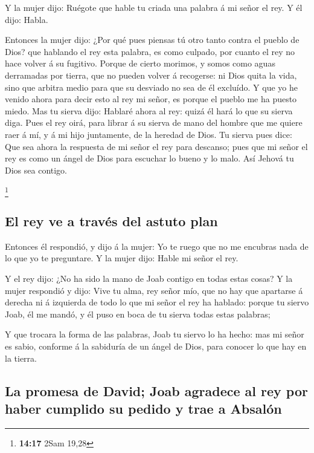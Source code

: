  Y la mujer dijo: Ruégote que hable tu criada una palabra á
mi señor el rey. Y él dijo: Habla.

 Entonces la mujer dijo: ¿Por qué pues piensas tú otro
tanto contra el pueblo de Dios? que hablando el rey esta palabra, es
como culpado, por cuanto el rey no hace volver á su fugitivo.
 Porque de cierto morimos, y somos como aguas derramadas
por tierra, que no pueden volver á recogerse: ni Dios quita la vida,
sino que arbitra medio para que su desviado no sea de él excluído.
 Y que yo he venido ahora para decir esto al rey mi señor,
es porque el pueblo me ha puesto miedo. Mas tu sierva dijo: Hablaré
ahora al rey: quizá él hará lo que su sierva diga.  Pues el
rey oirá, para librar á su sierva de mano del hombre que me quiere raer
á mí, y á mi hijo juntamente, de la heredad de Dios.  Tu
sierva pues dice: Que sea ahora la respuesta de mi señor el rey para
descanso; pues que mi señor el rey es como un ángel de Dios para
escuchar lo bueno y lo malo. Así Jehová tu Dios sea contigo.

\footnote{\textbf{14:17} 2Sam 19,28}

\hypertarget{el-rey-ve-a-travuxe9s-del-astuto-plan}{%
\subsection{El rey ve a través del astuto
plan}\label{el-rey-ve-a-travuxe9s-del-astuto-plan}}

 Entonces él respondió, y dijo á la mujer: Yo te ruego que
no me encubras nada de lo que yo te preguntare. Y la mujer dijo: Hable
mi señor el rey.

 Y el rey dijo: ¿No ha sido la mano de Joab contigo en
todas estas cosas? Y la mujer respondió y dijo: Vive tu alma, rey señor
mío, que no hay que apartarse á derecha ni á izquierda de todo lo que mi
señor el rey ha hablado: porque tu siervo Joab, él me mandó, y él puso
en boca de tu sierva todas estas palabras;

 Y que trocara la forma de las palabras, Joab tu siervo lo
ha hecho: mas mi señor es sabio, conforme á la sabiduría de un ángel de
Dios, para conocer lo que hay en la tierra.

\hypertarget{la-promesa-de-david-joab-agradece-al-rey-por-haber-cumplido-su-pedido-y-trae-a-absaluxf3n}{%
\subsection{La promesa de David; Joab agradece al rey por haber cumplido
su pedido y trae a
Absalón}\label{la-promesa-de-david-joab-agradece-al-rey-por-haber-cumplido-su-pedido-y-trae-a-absaluxf3n}}

